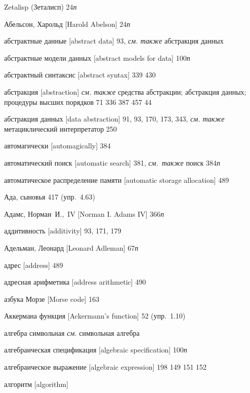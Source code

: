 \begin{theindex}
\bigskip
\item {Zetalisp (Зеталисп)} 24{\it п}
\bigskip
\item {Абельсон, Харольд [Harold Abelson]} 24{\it п}
\item {абстрактные данные [abstract data]} 93, {\it см. также} абстракция данных
\item {абстрактные модели данных [abstract models for data]} 100{\it п}
\item {абстрактный синтаксис [abstract syntax]}
   339
   430
\item {абстракция [abstraction]} {\it см. также} средства абстракции; абстракция данных; процедуры высших порядков
   71
   336
   387
   457
   44
\item {абстракция данных [data abstraction]} 91, 93, 170, 173, 343, {\it см. также} метациклический интерпретатор
   250
\item {автомагически [automagically]} 384
\item {автоматический поиск [automatic search]} 381, {\it см.~также} поиск
   384{\it п}
\item {автоматическое распределение памяти [automatic storage allocation]} 489
\item {Ада, сыновья} 417 (упр.~4.63)
\item {Адамс, Норман~И.,~IV [Norman I. Adams IV]} 366{\it п}
\item {аддитивность [additivity]} 93, 171, 179
\item {Адельман, Леонард [Leonard Adleman]} 67{\it п}
\item {адрес [address]} 489
\item {адресная арифметика [address arithmetic]} 490
\item {азбука Морзе [Morse code]} 163
\item {Аккермана функция [Ackermann's function]} 52 (упр.~1.10)
\item {алгебра символьная} {\it см.} символьная алгебра
\item {алгебраическая спецификация [algebraic specification]} 100{\it п}
\item {алгебраическое выражение [algebraic expression]} 198
   149
   151
   152
\item {алгоритм [algorithm]}

\end{theindex}
